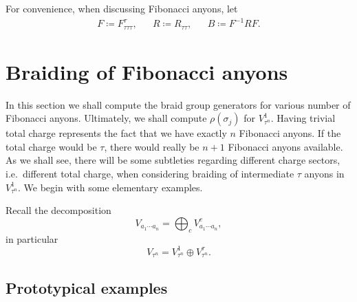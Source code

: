 For convenience, when discussing Fibonacci anyons, let
\begin{equation}
  \begin{aligned}
    F \coloneqq F_{τττ}^τ, &&
    R \coloneqq R_{ττ}, &&
    B \coloneqq F^{-1} R F.
  \end{aligned}
\end{equation}



\section{Braiding of Fibonacci anyons}

In this section we shall compute the braid group generators for various number of Fibonacci anyons. Ultimately, we shall compute $ρ(σ_j)$ for $V_{τ^n}^1$. Having trivial total charge represents the fact that we have exactly $n$ Fibonacci anyons. If the total charge would be $τ$, there would really be $n+1$ Fibonacci anyons available. As we shall see, there will be some subtleties regarding different charge sectors, i.e.\ different total charge, when considering braiding of intermediate $τ$ anyons in $V_{τ^n}^1$. We begin with some elementary examples.

Recall the decomposition
\begin{equation}
  V_{a_1\cdots a_n} = \bigoplus_{c} V_{a_1 \cdots a_n}^c,
\end{equation}
in particular
\begin{equation}
  V_{τ^n} = V_{τ^n}^1 \oplus V_{τ^n}^τ.
\end{equation}


\subsection{Prototypical examples}

